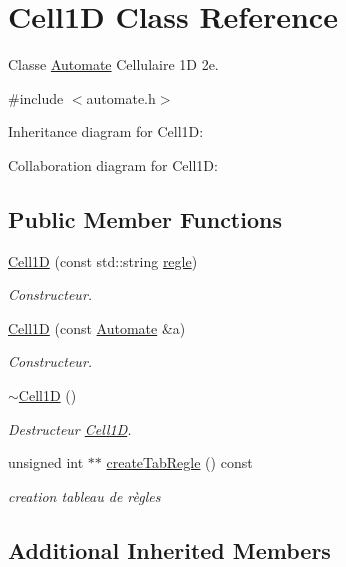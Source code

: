 \hypertarget{class_cell1_d}{}\section{Cell1D Class Reference}
\label{class_cell1_d}


Classe \mbox{\hyperlink{class_automate}{Automate}} Cellulaire 1D 2e.  




{\ttfamily \#include $<$automate.\+h$>$}



Inheritance diagram for Cell1D\+:


Collaboration diagram for Cell1D\+:
\subsection*{Public Member Functions}
\begin{DoxyCompactItemize}
\item 
\mbox{\hyperlink{class_cell1_d_a0add85ca9873fd68bdcee14e8052a308}{Cell1D}} (const std\+::string \mbox{\hyperlink{class_automate_a7f9e28d421ef41372273778f182e8f22}{regle}})
\begin{DoxyCompactList}\small\item\em Constructeur. \end{DoxyCompactList}\item 
\mbox{\hyperlink{class_cell1_d_a19f146ea795bddf124f4028786b4dfca}{Cell1D}} (const \mbox{\hyperlink{class_automate}{Automate}} \&a)
\begin{DoxyCompactList}\small\item\em Constructeur. \end{DoxyCompactList}\item 
\mbox{\hyperlink{class_cell1_d_a42c2d4e7a54430f75eb69eca13c2dbd6}{$\sim$\+Cell1D}} ()
\begin{DoxyCompactList}\small\item\em Destructeur \mbox{\hyperlink{class_cell1_d}{Cell1D}}. \end{DoxyCompactList}\item 
unsigned int $\ast$$\ast$ \mbox{\hyperlink{class_cell1_d_aa19cf29a243066c0883c1c984ee55afe}{create\+Tab\+Regle}} () const
\begin{DoxyCompactList}\small\item\em creation tableau de règles \end{DoxyCompactList}\end{DoxyCompactItemize}
\subsection*{Additional Inherited Members}



